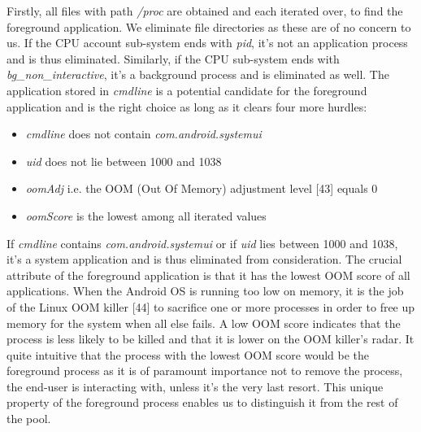 \documentclass[12pt]{uthesis-v12}  %
\begin{document}
			Firstly, all files with path {\em /proc} are obtained and each iterated over, to find the foreground application. We eliminate file directories as these are of no concern to us. If the CPU account sub-system ends with {\em pid}, it's not an application process and is thus eliminated. Similarly, if the CPU sub-system ends with {\em bg\_non\_interactive}, it's a background process and is eliminated as well. The application stored in {\em cmdline} is a potential candidate for the foreground application and is the right choice as long as it clears four more hurdles:
			
			\begin{itemize}
				\item {\em cmdline} does not contain {\em com.android.systemui}
				\item {\em uid} does not lie between 1000 and 1038
				\item {\em oomAdj} i.e. the OOM (Out Of Memory) adjustment level [43] equals 0
				\item {\em oomScore} is the lowest among all iterated values
			\end{itemize}
			
			If {\em cmdline} contains {\em com.android.systemui} or if {\em uid} lies between 1000 and 1038, it's a system application and is thus eliminated from consideration. The crucial attribute of the foreground application is that it has the lowest OOM score of all applications. When the Android OS is running too low on memory, it is the job of the Linux OOM killer [44] to sacrifice one or more processes in order to free up memory for the system when all else fails. A low OOM score indicates that the process is less likely to be killed and that it is lower on the OOM killer's radar. It quite intuitive that the process with the lowest OOM score would be the foreground process as it is of paramount importance not to remove the process, the end-user is interacting with, unless it's the very last resort. This unique property of the foreground process enables us to distinguish it from the rest of the pool. 
			
\end{document}
